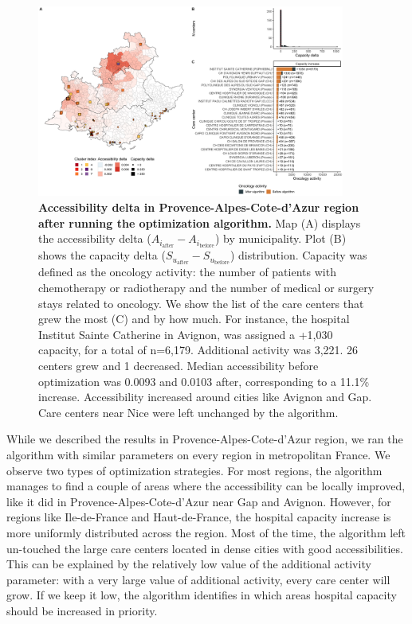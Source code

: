 \begin{figure}[H]
    \includegraphics[width=0.9\textwidth]{images/camion/fig5_Provence-Alpes-Cote-d'Azur.png}
    \centering
    \caption{
        \textbf{Accessibility delta in Provence-Alpes-Cote-d'Azur region after running the optimization algorithm.} Map (A) displays the accessibility delta ($A_{i_\text{after}} - A_{i_\text{before}}$) by municipality. Plot (B) shows the capacity delta ($S_{u_\text{after}}-S_{u_\text{before}}$) distribution. Capacity was defined as the oncology activity: the number of patients with chemotherapy or radiotherapy and the number of medical or surgery stays related to oncology. We show the list of the care centers that grew the most (C)  and by how much. For instance, the hospital Institut Sainte Catherine in Avignon, was assigned a +1,030 capacity, for a total of n=6,179. Additional activity was 3,221. 26 centers grew and 1 decreased. Median accessibility before optimization was 0.0093 and 0.0103 after, corresponding to a 11.1\% increase.  Accessibility increased around cities like Avignon and Gap. Care centers near Nice were left unchanged by the algorithm.
    }
    \label{fig:optim-paca}
\end{figure}

While we described the results in Provence-Alpes-Cote-d'Azur region, we ran the algorithm with similar parameters on every region in metropolitan France. We observe two types of optimization strategies. For most regions, the algorithm manages to find a couple of areas where the accessibility can be locally improved, like it did in Provence-Alpes-Cote-d'Azur near Gap and Avignon. However, for regions like Ile-de-France and Haut-de-France, the hospital capacity increase is more uniformly distributed across the region. Most of the time, the algorithm left un-touched the large care centers located in dense cities with good accessibilities. This can be explained by the relatively low value of the additional activity parameter: with a very large value of additional activity, every care center will grow. If we keep it low, the algorithm identifies in which areas hospital capacity should be increased in priority.

